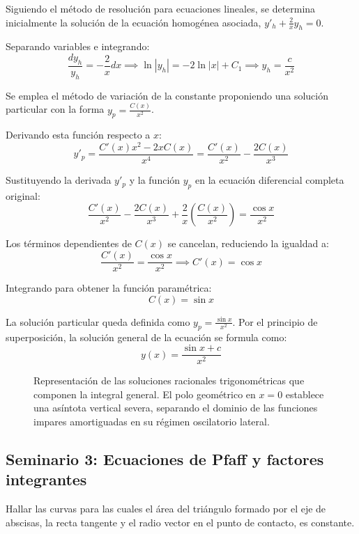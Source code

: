 \begin{tcolorbox}
Siguiendo el método de resolución para ecuaciones lineales, se determina inicialmente la solución de la ecuación homogénea asociada, $y'_h + \frac{2}{x}y_h = 0$.

Separando variables e integrando:
$$ \frac{dy_h}{y_h} = -\frac{2}{x}dx \implies \ln|y_h| = -2\ln|x| + C_1 \implies y_h = \frac{c}{x^2} $$

Se emplea el método de variación de la constante proponiendo una solución particular con la forma $y_p = \frac{C(x)}{x^2}$. 

Derivando esta función respecto a $x$:
$$ y'_p = \frac{C'(x)x^2 - 2xC(x)}{x^4} = \frac{C'(x)}{x^2} - \frac{2C(x)}{x^3} $$

Sustituyendo la derivada $y'_p$ y la función $y_p$ en la ecuación diferencial completa original:
$$ \frac{C'(x)}{x^2} - \frac{2C(x)}{x^3} + \frac{2}{x}\left(\frac{C(x)}{x^2}\right) = \frac{\cos x}{x^2} $$

Los términos dependientes de $C(x)$ se cancelan, reduciendo la igualdad a:
$$ \frac{C'(x)}{x^2} = \frac{\cos x}{x^2} \implies C'(x) = \cos x $$

Integrando para obtener la función paramétrica:
$$ C(x) = \sin x $$

La solución particular queda definida como $y_p = \frac{\sin x}{x^2}$. Por el principio de superposición, la solución general de la ecuación se formula como:
$$ y(x) = \frac{\sin x + c}{x^2} $$

\begin{figure}[H]
    \centering
    
    \caption{Representación de las soluciones racionales trigonométricas que componen la integral general. El polo geométrico en $x = 0$ establece una asíntota vertical severa, separando el dominio de las funciones impares amortiguadas en su régimen oscilatorio lateral.}
\end{figure}
\end{tcolorbox}

\subsection{Seminario 3: Ecuaciones de Pfaff y factores integrantes}

\begin{ejercicio}
Hallar las curvas para las cuales el área del triángulo formado por el eje de abscisas, la recta tangente y el radio vector en el punto de contacto, es constante.
\end{ejercicio}

